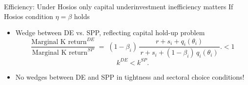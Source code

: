 \documentclass[9pt,xcolor={svgnames}]{beamer}
\begin{document}
\begin{frame}{Efficiency: Under Hosios only capital underinvestment inefficiency matters}
If Hosios condition $\eta = \beta$ holds %
\begin{itemize}
   \item Wedge between DE vs. SPP, reflecting capital hold-up problem
\[
\frac{\text{Marginal K return}^{DE}}{\text{Marginal K return}^{SP}}
\;=\;(1-\beta_i)\,\frac{\,r+s_i+q_i(\theta_i)\,}{\,r+s_i+(1-\beta_i)\,q_i(\theta_i)\,}.
< 1\]
\[k^{DE} < k^{SP}.\] 

\item No wedges between DE and SPP in tightness and sectoral choice conditions!

\end{itemize}


\vspace{0.1cm}
\begin{center}
\end{center}
\end{frame}
\end{document}
